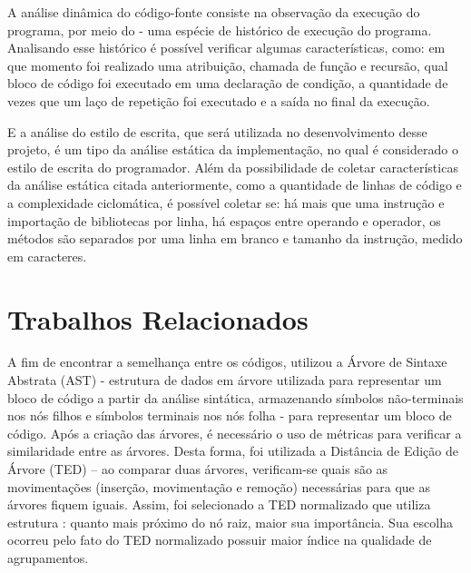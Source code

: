 		A análise dinâmica do código-fonte consiste na observação da execução do programa,
		por meio do  - uma espécie de histórico de execução do programa. Analisando
		esse histórico é possível verificar algumas características, como: em que momento foi
		realizado uma atribuição, chamada de função e recursão, qual bloco de código foi
		executado em uma declaração de condição, a quantidade de vezes que um laço de repetição
		foi executado e a saída no final da execução.
		
		E a análise do estilo de escrita, que será utilizada no desenvolvimento desse projeto,
		é um tipo da análise estática da implementação, no qual é considerado o estilo de
		escrita do programador. Além da possibilidade de coletar características da análise
		estática citada anteriormente, como a quantidade de linhas de código e a complexidade
		ciclomática, é possível coletar se: há mais que uma instrução e importação de bibliotecas
		por linha, há espaços entre operando e operador, os métodos são separados por uma linha
		em branco e tamanho da instrução, medido em caracteres.

	\section{Trabalhos Relacionados}
	
	    A fim de encontrar a semelhança entre os códigos, 
	    utilizou a Árvore de Sintaxe Abstrata (AST) - estrutura de dados em árvore
	    utilizada para representar um bloco de código a partir da análise sintática,
	    armazenando símbolos não-terminais nos nós filhos e símbolos terminais nos
	    nós folha - para representar um bloco de código. Após a criação das árvores,
	    é necessário o uso de métricas para verificar a similaridade entre as árvores.
	    Desta forma, foi utilizada a Distância de Edição de Árvore (TED) – ao comparar
	    duas árvores, verificam-se quais são as movimentações (inserção, movimentação
	    e remoção) necessárias para que as árvores fiquem iguais. Assim, foi
	    selecionado a TED normalizado que utiliza estrutura :
	    quanto mais próximo do nó raiz, maior sua importância. Sua escolha ocorreu
	    pelo fato do TED normalizado possuir maior índice na qualidade de agrupamentos.
	    
